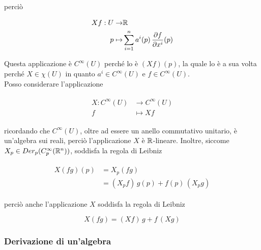perciò

\begin{align}
	\begin{split}
		X f : U \to& \mathbb{R}\\
		p \mapsto& \sum_{i=1}^{n} a^{i}(p) \, \dfrac{\partial f}{\partial x^{i}} (p)
	\end{split}
\end{align}

Questa applicazione è $ C^{\infty}(U) $ perché lo è $ (X f) (p) $, la quale lo è a sua volta perché $ X \in \chi(U) $ in quanto $ a^{i} \in C^{\infty}(U) $ e $ f \in C^{\infty}(U) $.\\
Posso considerare l'applicazione

\begin{align}
	\begin{split}
		X : C^{\infty}(U) &\to C^{\infty}(U)\\
		f &\mapsto X f
	\end{split}
\end{align}

ricordando che $ C^{\infty}(U) $, oltre ad essere un anello commutativo unitario, è un'algebra sui reali, perciò l'applicazione $ X $ è $ \mathbb{R} $-lineare. Inoltre, siccome $ X_{p} \in Der_{p}(C_{p}^{\infty}(\mathbb{R}^{n})) $, soddisfa la regola di Leibniz

\begin{align}
	\begin{split}
		X (f g) (p) &= X_{p} (f g)\\
		&= (X_{p} f) \, g(p) + f(p) \, (X_{p} g) 
	\end{split}
\end{align}

perciò anche l'applicazione $ X $ soddisfa la regola di Leibniz

\begin{equation}
	X (f g) = (X f) \, g + f \, (X g)
\end{equation}

\subsubsection{Derivazione di un'algebra}

